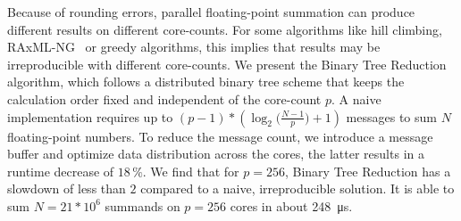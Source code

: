 
\Abstract
Because of rounding errors, parallel floating-point summation can produce different results on different core-counts.
For some algorithms like hill climbing, RAxML-NG~\cite{kozlov_raxml-ng_2019} or greedy algorithms, this implies that results may be irreproducible with different core-counts.
We present the Binary Tree Reduction algorithm, which follows a distributed binary tree scheme that keeps the calculation order fixed and independent of the core-count $p$.
A naive implementation requires up to $(p - 1) * (\log_2 \big(\frac{N-1}{p} \big) + 1)$ messages to sum $N$ floating-point numbers.
To reduce the message count, we introduce a message buffer and optimize data distribution across the cores, the latter results in a runtime decrease of $18\,\%$.
We find that for $p=256$, Binary Tree Reduction has a slowdown of less than $2$ compared to a naive, irreproducible solution.
It is able to sum $N=21 * 10^6$ summands on $p=256$ cores in about \SI{248}{\micro\second}.